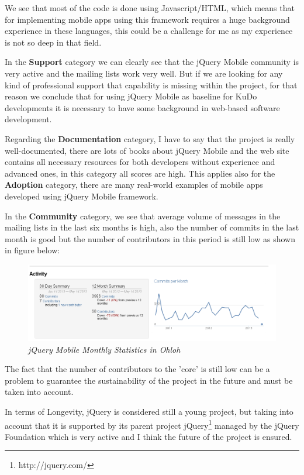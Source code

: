 \documentclass[a4paper,12pt]{book}
\begin{document}
We see that most of the code is done using Javascript/HTML, which means that for implementing mobile apps using this framework requires a huge background experience in these languages, this could be a challenge for me as my experience is not so deep in that field.

In the \textbf{Support} category we can clearly see that the jQuery Mobile community is very active and the mailing lists work very well. But if we are looking for any kind of professional support that capability is missing within the project, for that reason we conclude that for using jQuery Mobile as baseline for KuDo developments it is necessary to have some background in web-based software development.

Regarding the \textbf{Documentation} category, I have to say that the project is really well-documented, there are lots of books about jQuery Mobile and the web site contains all necessary resources for both developers without experience and advanced ones, in this category all scores are high. This applies also for the \textbf{Adoption} category, there are many real-world examples of mobile apps developed using jQuery Mobile framework.

In the \textbf{Community} category, we see that average volume of messages in the mailing lists in the last six months is high, also the number of commits in the last month is good but the number of contributors in this period is still low as shown in figure below:

\begin{figure}[H]
    \centering
    \includegraphics[width=15cm, keepaspectratio]{img/jqueryohloh.png}
    \caption{\textit{jQuery Mobile Monthly Statistics in Ohloh}}
    \label{figure:jquerymonthly}
 \end{figure}
 
The fact that the number of contributors to the 'core' is still low can be a problem to guarantee the sustainability of the project in the future and must be taken into account.

In terms of Longevity, jQuery is considered still a young project, but taking into account that it is supported by its parent project jQuery\footnote{http://jquery.com/}  managed by the jQuery Foundation\cite{jQuery Foundation} which is very active and I think the future of the project is ensured.
\end{document}

